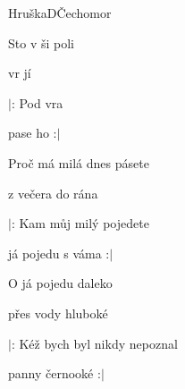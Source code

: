 \setcounter{page}{31}
\begin{song}{Hruška}{D}{Čechomor}

\begin{SBVerse}

Sto v ši poli

vr jí 

$|$: Pod    vra

pase ho  :$|$

\end{SBVerse}

\begin{SBVerse}

Proč má milá dnes pásete

z večera do rána

$|$: Kam můj milý pojedete

já pojedu s váma :$|$

\end{SBVerse}

\begin{SBVerse}

O já pojedu daleko

přes vody hluboké

$|$: Kéž bych byl nikdy nepoznal

panny černooké :$|$

\end{SBVerse}

\end{song}

\clearpage
